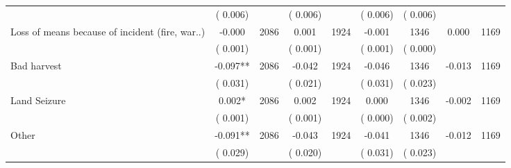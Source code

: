 \begin{tabular}{l*{8}{c}}
                       &       (       0.006)            &                               &       (       0.006)            &                               &       (       0.006)            &       (       0.006) &                  \\
Loss of means because of incident (fire, war..)        &             -0.000      &       2086       &              0.001      &       1924       &             -0.001      &       1346  &        0.000 &       1169       \\
                       &       (       0.001)            &                               &       (       0.001)            &                               &       (       0.001)            &       (       0.000) &                  \\
Bad harvest        &             -0.097**      &       2086       &             -0.042      &       1924       &             -0.046      &       1346  &       -0.013 &       1169       \\
                       &       (       0.031)            &                               &       (       0.021)            &                               &       (       0.031)            &       (       0.023) &                  \\
Land Seizure        &              0.002*      &       2086       &              0.002      &       1924       &              0.000      &       1346  &       -0.002 &       1169       \\
                       &       (       0.001)            &                               &       (       0.001)            &                               &       (       0.000)            &       (       0.002) &                  \\
Other        &             -0.091**      &       2086       &             -0.043      &       1924       &             -0.041      &       1346  &       -0.012 &       1169       \\
                       &       (       0.029)            &                               &       (       0.020)            &                               &       (       0.031)            &       (       0.023) &                  \\
\hline \end{tabular}
